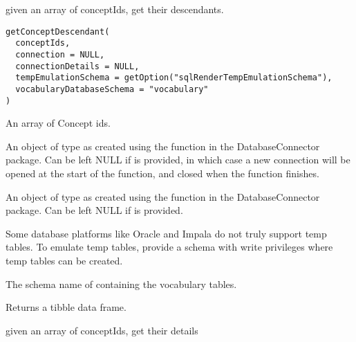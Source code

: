 \documentclass[a4paper]{book}
\begin{document}
%
\begin{Description}\relax
given an array of conceptIds, get their descendants.
\end{Description}
%
\begin{Usage}
\begin{verbatim}
getConceptDescendant(
  conceptIds,
  connection = NULL,
  connectionDetails = NULL,
  tempEmulationSchema = getOption("sqlRenderTempEmulationSchema"),
  vocabularyDatabaseSchema = "vocabulary"
)
\end{verbatim}
\end{Usage}
%
\begin{Arguments}
\begin{ldescription}
\item[\code{conceptIds}] An array of Concept ids.

\item[\code{connection}] An object of type  as created using the
 function in the
DatabaseConnector package. Can be left NULL if 
is provided, in which case a new connection will be opened at the start
of the function, and closed when the function finishes.

\item[\code{connectionDetails}] An object of type  as created using the
 function in the
DatabaseConnector package. Can be left NULL if  is
provided.

\item[\code{tempEmulationSchema}] Some database platforms like Oracle and Impala do not truly support temp tables. To emulate temp 
tables, provide a schema with write privileges where temp tables can be created.

\item[\code{vocabularyDatabaseSchema}] The schema name of containing the vocabulary tables.
\end{ldescription}
\end{Arguments}
%
\begin{Value}
Returns a tibble data frame.
\end{Value}
%
\begin{Description}\relax
given an array of conceptIds, get their details
\end{Description}
\end{document}
